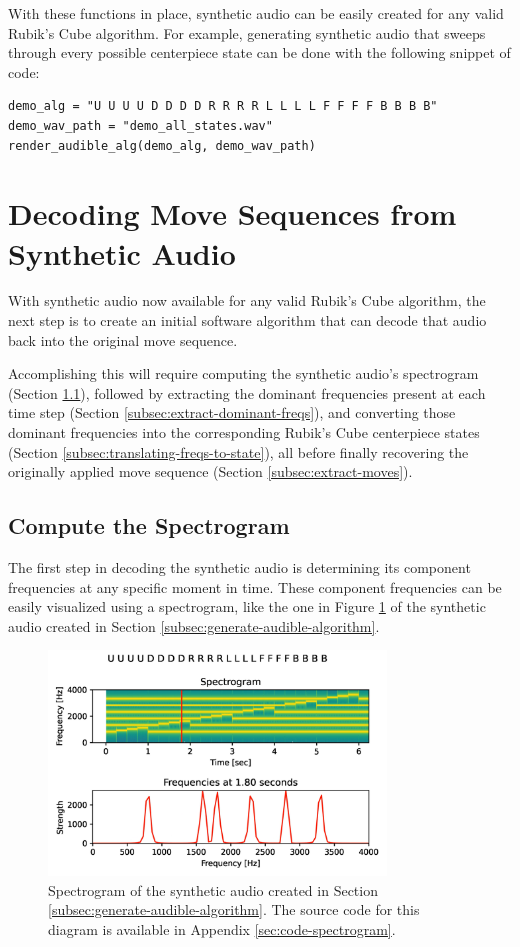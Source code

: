 With these functions in place, synthetic audio can be easily created for any valid Rubik's Cube algorithm. For example, generating synthetic audio that sweeps through every possible centerpiece state can be done with the following snippet of code:

\begin{verbatim}
demo_alg = "U U U U D D D D R R R R L L L L F F F F B B B B"
demo_wav_path = "demo_all_states.wav"
render_audible_alg(demo_alg, demo_wav_path)
\end{verbatim}


\section{Decoding Move Sequences from Synthetic Audio}
\label{sec:decoding-synthetic-audio}
With synthetic audio now available for any valid Rubik's Cube algorithm, the next step is to create an initial software algorithm that can decode that audio back into the original move sequence.

Accomplishing this will require computing the synthetic audio's spectrogram (Section \ref{subsec:compute-spectrogram}), followed by extracting the dominant frequencies present at each time step (Section \ref{subsec:extract-dominant-freqs}), and converting those dominant frequencies into the corresponding Rubik's Cube centerpiece states (Section \ref{subsec:translating-freqs-to-state}), all before finally recovering the originally applied move sequence (Section \ref{subsec:extract-moves}).

\newpage
\subsection{Compute the Spectrogram}
\label{subsec:compute-spectrogram}
The first step in decoding the synthetic audio is determining its component frequencies at any specific moment in time.
These component frequencies can be easily visualized using a spectrogram, like the one in Figure \ref{fig:spectrogram} of the synthetic audio created in Section \ref{subsec:generate-audible-algorithm}.

\begin{figure}[h]
    \centering
    \includegraphics[width=0.8\textwidth]{Figures/5 Algorithm Design/component_frequencies.png}
    \caption{Spectrogram of the synthetic audio created in Section \ref{subsec:generate-audible-algorithm}. The source code for this diagram is available in Appendix \ref{sec:code-spectrogram}.}
    \label{fig:spectrogram}
\end{figure}

